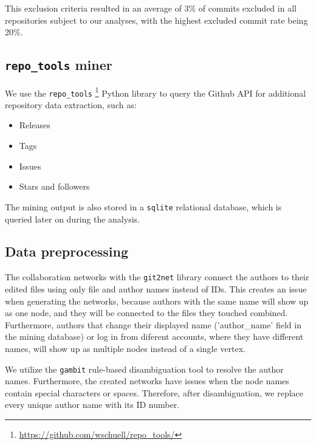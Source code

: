 This exclusion criteria resulted in an average of 3\% of commits excluded in all repositories subject to our analyses, with the highest excluded commit rate being 20\%.

\subsection{\texttt{repo\_tools} miner} 

We use the \texttt{repo\_tools} \footnote{\url{https://github.com/wschuell/repo\_tools/}} Python library to query the Github API for additional repository data extraction, such as:

\begin{itemize}
    \item Releases
    \item Tags
    \item Issues
    \item Stars and followers
\end{itemize}

The mining output is also stored in a \texttt{sqlite} relational database, which is queried later on during the analysis. 


\subsection{Data preprocessing}

The collaboration networks with the \texttt{git2net} library connect the authors to their edited files using only file and author names instead of IDs. This creates an issue when generating the networks, because authors with the same name will show up as one node, and they will be connected to the files they touched combined. Furthermore, authors that change their displayed name ('author\_name' field in the mining database) or log in from diferent accounts, where they have different names, will show up as multiple nodes instead of a single vertex.

We utilize the \texttt{gambit} \cite{goteGambitOpenSource2021} rule-based disambiguation tool to resolve the author names. Furthermore, the created networks have issues when the node names contain special characters or spaces. Therefore, after disambiguation, we replace every unique author name with its ID number.

